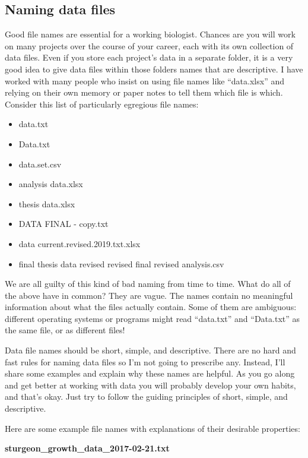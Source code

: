 \documentclass[
  13,
  letterpaper,
]{report}
\begin{document}
\subsection{Naming data files}\label{sec-04-format-name}

Good file names are essential for a working biologist. Chances are you
will work on many projects over the course of your career, each with its
own collection of data files. Even if you store each project's data in a
separate folder, it is a very good idea to give data files within those
folders names that are descriptive. I have worked with many people who
insist on using file names like ``data.xlsx'' and relying on their own
memory or paper notes to tell them which file is which. Consider this
list of particularly egregious file names:

\begin{itemize}
\item
  data.txt
\item
  Data.txt
\item
  data.set.csv
\item
  analysis data.xlsx
\item
  thesis data.xlsx
\item
  DATA FINAL - copy.txt
\item
  data current.revised.2019.txt.xlsx
\item
  final thesis data revised revised final revised analysis.csv
\end{itemize}

We are all guilty of this kind of bad naming from time to time. What do
all of the above have in common? They are vague. The names contain no
meaningful information about what the files actually contain. Some of
them are ambiguous: different operating systems or programs might read
``data.txt'' and ``Data.txt'' as the same file, or as different files!

Data file names should be short, simple, and descriptive. There are no
hard and fast rules for naming data files so I'm not going to prescribe
any. Instead, I'll share some examples and explain why these names are
helpful. As you go along and get better at working with data you will
probably develop your own habits, and that's okay. Just try to follow
the guiding principles of short, simple, and descriptive.

Here are some example file names with explanations of their desirable
properties:

\textbf{sturgeon\_growth\_data\_2017-02-21.txt}
\end{document}
